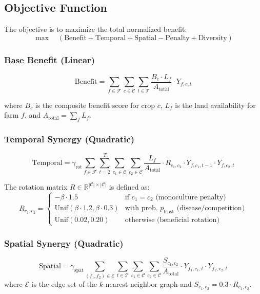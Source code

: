 \documentclass[11pt,a4paper]{article}
\begin{document}
\subsection{Objective Function}

The objective is to maximize the total normalized benefit:
\begin{equation}
\max \quad \left( \text{Benefit} + \text{Temporal} + \text{Spatial} - \text{Penalty} + \text{Diversity} \right)
\end{equation}

\subsubsection{Base Benefit (Linear)}
\begin{equation}
\text{Benefit} = \sum_{f \in \mathcal{F}} \sum_{c \in \mathcal{C}} \sum_{t \in \mathcal{T}} \frac{B_c \cdot L_f}{A_{\text{total}}} \cdot Y_{f,c,t}
\end{equation}

where $B_c$ is the composite benefit score for crop $c$, $L_f$ is the land availability for farm $f$, and $A_{\text{total}} = \sum_{f} L_f$.

\subsubsection{Temporal Synergy (Quadratic)}
\begin{equation}
\text{Temporal} = \gamma_{\text{rot}} \sum_{f \in \mathcal{F}} \sum_{t=2}^{T} \sum_{c_1 \in \mathcal{C}} \sum_{c_2 \in \mathcal{C}} \frac{L_f}{A_{\text{total}}} \cdot R_{c_1,c_2} \cdot Y_{f,c_1,t-1} \cdot Y_{f,c_2,t}
\end{equation}

The rotation matrix $R \in \mathbb{R}^{|\mathcal{C}| \times |\mathcal{C}|}$ is defined as:
\begin{equation}
R_{c_1,c_2} = \begin{cases}
-\beta \cdot 1.5 & \text{if } c_1 = c_2 \text{ (monoculture penalty)} \\
\text{Unif}(\beta \cdot 1.2, \beta \cdot 0.3) & \text{with prob. } p_{\text{frust}} \text{ (disease/competition)} \\
\text{Unif}(0.02, 0.20) & \text{otherwise (beneficial rotation)}
\end{cases}
\end{equation}

\subsubsection{Spatial Synergy (Quadratic)}
\begin{equation}
\text{Spatial} = \gamma_{\text{spat}} \sum_{(f_1, f_2) \in \mathcal{E}} \sum_{t \in \mathcal{T}} \sum_{c_1 \in \mathcal{C}} \sum_{c_2 \in \mathcal{C}} \frac{S_{c_1,c_2}}{A_{\text{total}}} \cdot Y_{f_1,c_1,t} \cdot Y_{f_2,c_2,t}
\end{equation}
where $\mathcal{E}$ is the edge set of the $k$-nearest neighbor graph and $S_{c_1,c_2} = 0.3 \cdot R_{c_1,c_2}$.
\end{document}
